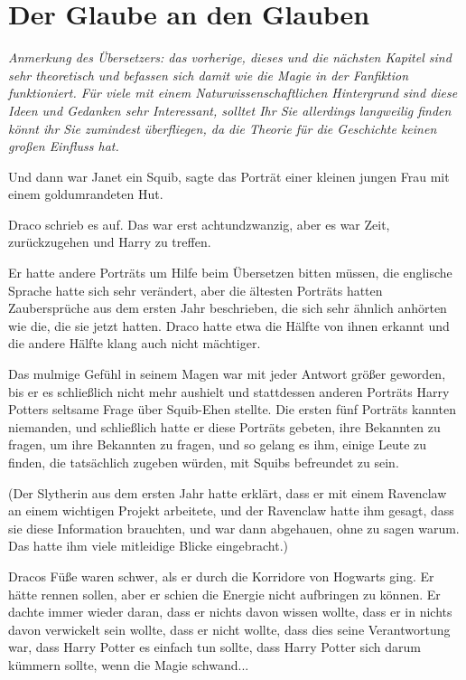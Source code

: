 \chapter{Der Glaube an den Glauben}

\emph{Anmerkung des Übersetzers: das vorherige, dieses und die nächsten Kapitel
sind sehr theoretisch und befassen sich damit wie die Magie in der Fanfiktion
funktioniert. Für viele mit einem Naturwissenschaftlichen Hintergrund sind diese
Ideen und Gedanken sehr Interessant, solltet Ihr Sie allerdings langweilig
finden könnt ihr Sie zumindest überfliegen, da die Theorie für die Geschichte
keinen großen Einfluss hat.}

\glqq{}Und dann war Janet ein Squib\grqq{}, sagte das Porträt einer kleinen
jungen Frau mit einem goldumrandeten Hut.

Draco schrieb es auf. Das war erst achtundzwanzig, aber es war Zeit,
zurückzugehen und Harry zu treffen.

Er hatte andere Porträts um Hilfe beim Übersetzen bitten müssen, die englische
Sprache hatte sich sehr verändert, aber die ältesten Porträts hatten
Zaubersprüche aus dem ersten Jahr beschrieben, die sich sehr ähnlich anhörten
wie die, die sie jetzt hatten. Draco hatte etwa die Hälfte von ihnen erkannt und
die andere Hälfte klang auch nicht mächtiger.

Das mulmige Gefühl in seinem Magen war mit jeder Antwort größer geworden, bis er
es schließlich nicht mehr aushielt und stattdessen anderen Porträts Harry
Potters seltsame Frage über Squib-Ehen stellte. Die ersten fünf Porträts kannten
niemanden, und schließlich hatte er diese Porträts gebeten, ihre Bekannten zu
fragen, um ihre Bekannten zu fragen, und so gelang es ihm, einige Leute zu
finden, die tatsächlich zugeben würden, mit Squibs befreundet zu sein.

(Der Slytherin aus dem ersten Jahr hatte erklärt, dass er mit einem Ravenclaw an
einem wichtigen Projekt arbeitete, und der Ravenclaw hatte ihm gesagt, dass sie
diese Information brauchten, und war dann abgehauen, ohne zu sagen warum. Das
hatte ihm viele mitleidige Blicke eingebracht.)

Dracos Füße waren schwer, als er durch die Korridore von Hogwarts ging. Er hätte
rennen sollen, aber er schien die Energie nicht aufbringen zu können. Er dachte
immer wieder daran, dass er nichts davon wissen wollte, dass er in nichts davon
verwickelt sein wollte, dass er nicht wollte, dass dies seine Verantwortung war,
dass Harry Potter es einfach tun sollte, dass Harry Potter sich darum kümmern
sollte, wenn die Magie schwand...

